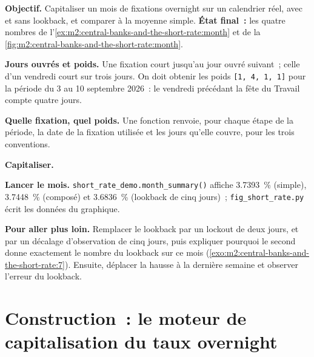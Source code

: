 \begin{tutorial}
\textbf{Objectif.} Capitaliser un mois de fixations overnight sur un calendrier
réel, avec et sans lookback, et comparer à la moyenne simple.
\textbf{État final~:} les quatre nombres de
l'\cref{ex:m2:central-banks-and-the-short-rate:month} et de
la \cref{fig:m2:central-banks-and-the-short-rate:month}.
\begin{tutsteps}
\item \textbf{Jours ouvrés et poids.} Une fixation court jusqu'au jour ouvré
suivant~; celle d'un vendredi court sur trois jours.
\label{lst:m2:central-banks-and-the-short-rate:weights}
On doit obtenir les poids \texttt{[1, 4, 1, 1]} pour la période du 3 au 10 septembre 2026~: le
vendredi précédant la fête du Travail compte quatre jours.
\item \textbf{Quelle fixation, quel poids.} Une fonction renvoie, pour chaque
étape de la période, la date de la fixation utilisée et les jours qu'elle
couvre, pour les trois conventions.
\label{lst:m2:central-banks-and-the-short-rate:obs}
\item \textbf{Capitaliser.}
\label{lst:m2:central-banks-and-the-short-rate:compound}
\item \textbf{Lancer le mois.} \texttt{short\_rate\_demo.month\_summary()}
affiche 3.7393~\% (simple), 3.7448~\% (composé) et 3.6836~\% (lookback de
cinq jours)~; \texttt{fig\_short\_rate.py} écrit les données du graphique.
\end{tutsteps}
\textbf{Pour aller plus loin.} Remplacer le lookback par un lockout de deux
jours, et par un décalage d'observation de cinq jours, puis expliquer pourquoi
le second donne exactement le nombre du lookback sur ce mois
(\cref{exo:m2:central-banks-and-the-short-rate:7}). Ensuite, déplacer la hausse à la dernière semaine et observer l'erreur du lookback.
\end{tutorial}

\section{Construction~: le moteur de capitalisation du taux overnight}\label{bld:m2:central-banks-and-the-short-rate:rfr}

